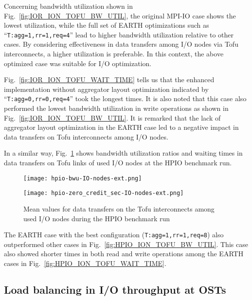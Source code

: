 \documentclass{jhps}
\begin{document}
Concerning bandwidth utilization shown in
Fig.~\ref{fig:IOR_ION_TOFU_BW_UTIL},
the original MPI-IO case shows the lowest utilization, while the full set of EARTH 
optimizations such as “{\tt T:agg=1,rr=1,req=4}” lead to higher bandwidth utilization
relative to other cases.
By considering effectiveness in data transfers among I/O nodes via Tofu interconnects,
a higher utilization is preferable.
In this context, the above optimized case was suitable for I/O optimization.

Fig.~\ref{fig:IOR_ION_TOFU_WAIT_TIME}
tells us that the enhanced implementation
without aggregator layout optimization indicated by “{\tt T:agg=0,rr=0,req=4}”
took the longest times.
It is also noted that this case also performed the lowest bandwidth utilization
in write operations as shown in
Fig.~\ref{fig:IOR_ION_TOFU_BW_UTIL}.
It is remarked that the lack of aggregator layout optimization in the EARTH case
led to a negative impact in data transfers on Tofu interconnects among I/O nodes.

In a similar way, Fig.~\ref{fig:HPIO_ION_TOFU_BWU_WAIT_TIME} shows
bandwidth utilization ratios and waiting times in data transfers
on Tofu links of used I/O nodes at the HPIO benchmark run.
%
\begin{figure}[htb]
\centering
\begin{minipage}[t]{0.48\textwidth}
 \centering
 \texttt{[image: hpio-bwu-IO-nodes-ext.png]}
 \label{fig:HPIO_ION_TOFU_BW_UTIL}
\end{minipage}
%
\noindent
\begin{minipage}[t]{0.48\textwidth}
 \centering
 \texttt{[image: hpio-zero\_credit\_sec-IO-nodes-ext.png]}
 \label{fig:HPIO_ION_TOFU_WAIT_TIME}
\end{minipage}
\caption{
Mean values for data transfers on the Tofu interconnects among used I/O nodes
during the HPIO benchmark run}
\label{fig:HPIO_ION_TOFU_BWU_WAIT_TIME}
\end{figure}
%
The EARTH case with the best configuration ({\tt T:agg=1,rr=1,req=8}) also
outperformed other cases in
Fig.~\ref{fig:HPIO_ION_TOFU_BW_UTIL}.
This case also showed shorter times in both read and write operations
among the EARTH cases in
Fig.~\ref{fig:HPIO_ION_TOFU_WAIT_TIME}.

\subsection{Load balancing in I/O throughput at OSTs}
\end{document}
